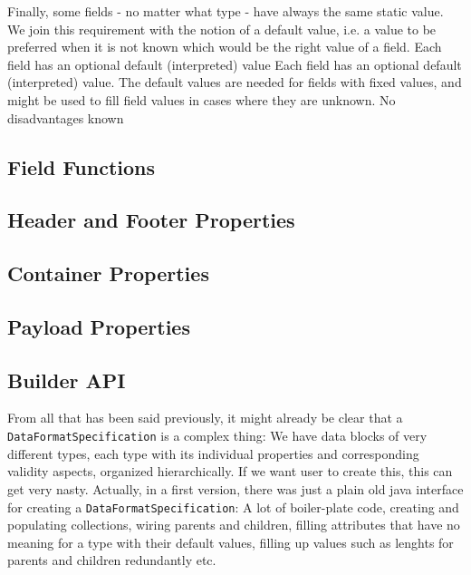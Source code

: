 Finally, some fields - no matter what type - have always the same static value. We join this requirement with the notion of a default value, i.e. a value to be preferred when it is not known which would be the right value of a field.
{%
Each field has an optional default (interpreted) value
}
{%
Each field has an optional default (interpreted) value.
}
{%
The default values are needed for fields with fixed values, and might be used to fill field values in cases where they are unknown.
}
{%
No disadvantages known
}


\subsection{Field Functions}%
\label{sec:FieldFunctions}%





\subsection{Header and Footer Properties}%
\label{sec:HeaderProperties}%


\subsection{Container Properties}%
\label{sec:ContainerProperties}%


\subsection{Payload Properties}%
\label{sec:PayloadProperties}%

\subsection{Builder API}%
\label{sec:BuilderAPI}%

From all that has been said previously, it might already be clear that a \texttt{DataFormatSpecification} is a complex thing: We have data blocks of very different types, each type with its individual properties and corresponding validity aspects, organized hierarchically. If we want user to create this, this can get very nasty. Actually, in a first version, there was just a plain old java interface for creating a \texttt{DataFormatSpecification}: A lot of boiler-plate code, creating and populating collections, wiring parents and children, filling attributes that have no meaning for a type with their default values, filling up values such as lenghts for parents and children redundantly etc.

